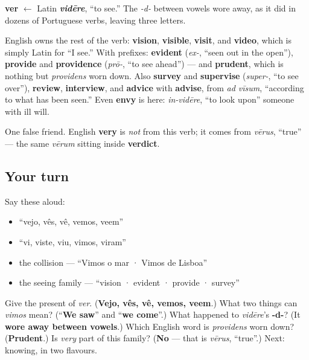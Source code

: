 \begin{cousinweb}
\textbf{ver} $\leftarrow$ Latin \emph{\textbf{vidēre}}, \textquotedblleft{}to see.\textquotedblright{} The \emph{-d-} between vowels wore away, as it did in dozens of Portuguese verbs, leaving three letters.

English owns the rest of the verb: \textbf{vision}, \textbf{visible}, \textbf{visit}, and \textbf{video}, which is simply Latin for \textquotedblleft{}I see.\textquotedblright{} With prefixes: \textbf{evident} (\emph{ex-}, \textquotedblleft{}seen out in the open\textquotedblright{}), \textbf{provide} and \textbf{providence} (\emph{prō-}, \textquotedblleft{}to see ahead\textquotedblright{}) — and \textbf{prudent}, which is nothing but \emph{providens} worn down. Also \textbf{survey} and \textbf{supervise} (\emph{super-}, \textquotedblleft{}to see over\textquotedblright{}), \textbf{review}, \textbf{interview}, and \textbf{advice} with \textbf{advise}, from \emph{ad vīsum}, \textquotedblleft{}according to what has been seen.\textquotedblright{} Even \textbf{envy} is here: \emph{in-vidēre}, \textquotedblleft{}to look upon\textquotedblright{} someone with ill will.

One false friend. English \textbf{very} is \emph{not} from this verb; it comes from \emph{vērus}, \textquotedblleft{}true\textquotedblright{} — the same \emph{vērum} sitting inside \textbf{verdict}.
\end{cousinweb}

\subsection*{Your turn}
Say these aloud:

\begin{itemize}
\raggedright
  \item \textquotedblleft{}vejo, vês, vê, vemos, veem\textquotedblright{}
  \item \textquotedblleft{}vi, viste, viu, vimos, viram\textquotedblright{}
  \item the collision — \textquotedblleft{}Vimos o mar · Vimos de Lisboa\textquotedblright{}
  \item the seeing family — \textquotedblleft{}vision · evident · provide · survey\textquotedblright{}
\end{itemize}

\begin{tcolorbox}[breakable,colback=teal!4,colframe=teal!35!black,title={Before you move on}]
Give the present of \emph{ver}. (\textbf{Vejo, vês, vê, vemos, veem}.) What two things can \emph{vimos} mean? (\textquotedblleft{}\textbf{We saw}\textquotedblright{} and \textquotedblleft{}\textbf{we come}\textquotedblright{}.) What happened to \emph{vidēre}'s \textbf{-d-}? (It \textbf{wore away between vowels}.) Which English word is \emph{providens} worn down? (\textbf{Prudent}.) Is \emph{very} part of this family? (\textbf{No} — that is \emph{vērus}, \textquotedblleft{}true\textquotedblright{}.) Next: knowing, in two flavours.
\end{tcolorbox}
